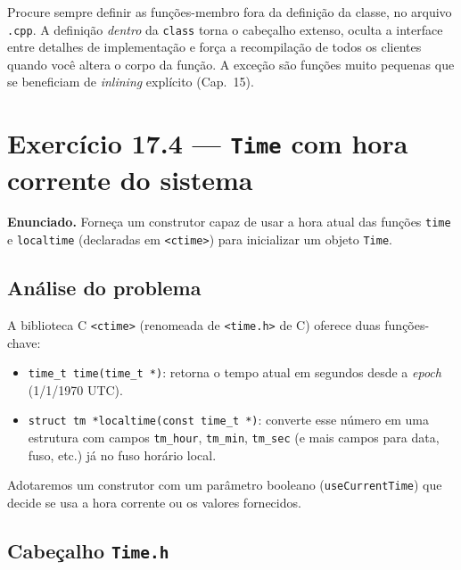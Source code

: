 \documentclass[11pt,a4paper]{article}
\begin{document}
\begin{boaprat}
Procure sempre definir as fun\c{c}\~oes-membro fora da defini\c{c}\~ao da classe, no arquivo \texttt{.cpp}. A definiq\~ao \emph{dentro} da \texttt{class} torna o cabe\c{c}alho extenso, oculta a interface entre detalhes de implementa\c{c}\~ao e for\c{c}a a recompila\c{c}\~ao de todos os clientes quando voc\^e altera o corpo da fun\c{c}\~ao. A exce\c{c}\~ao s\~ao fun\c{c}\~oes muito pequenas que se beneficiam de \emph{inlining} expl\'icito (Cap.~15).
\end{boaprat}

\section{Exerc\'icio 17.4 --- \texttt{Time} com hora corrente do sistema}

\begin{enunciado}
\textbf{Enunciado.} Forne\c{c}a um construtor capaz de usar a hora atual das fun\c{c}\~oes \texttt{time} e \texttt{localtime} (declaradas em \texttt{<ctime>}) para inicializar um objeto \texttt{Time}.
\end{enunciado}

\subsection*{An\'alise do problema}

A biblioteca C \texttt{<ctime>} (renomeada de \texttt{<time.h>} de C) oferece duas fun\c{c}\~oes-chave:

\begin{itemize}[leftmargin=*,itemsep=0pt]
  \item \texttt{time\_t time(time\_t *)}: retorna o tempo atual em segundos desde a \emph{epoch} (1/1/1970 UTC).
  \item \texttt{struct tm *localtime(const time\_t *)}: converte esse n\'umero em uma estrutura com campos \texttt{tm\_hour}, \texttt{tm\_min}, \texttt{tm\_sec} (e mais campos para data, fuso, etc.) j\'a no fuso hor\'ario local.
\end{itemize}

Adotaremos um construtor com um par\^ametro booleano (\texttt{useCurrentTime}) que decide se usa a hora corrente ou os valores fornecidos.

\subsection*{Cabe\c{c}alho \texttt{Time.h}}
\end{document}

